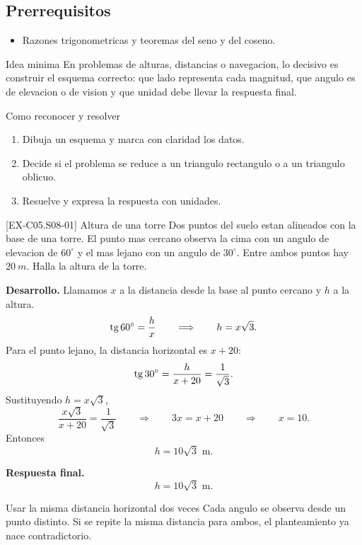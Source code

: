 \subsection*{Prerrequisitos}
\begin{itemize}
  \item Razones trigonometricas y teoremas del seno y del coseno.
\end{itemize}

\begin{theorybox}{Idea minima}
En problemas de alturas, distancias o navegacion, lo decisivo es construir el esquema correcto:
que lado representa cada magnitud, que angulo es de elevacion o de vision y que unidad debe
llevar la respuesta final.
\end{theorybox}

\begin{methodbox}{Como reconocer y resolver}
\begin{enumerate}
  \item Dibuja un esquema y marca con claridad los datos.
  \item Decide si el problema se reduce a un triangulo rectangulo o a un triangulo oblicuo.
  \item Resuelve y expresa la respuesta con unidades.
\end{enumerate}
\end{methodbox}

\begin{solvedexample}{[EX-C05.S08-01] Altura de una torre}
Dos puntos del suelo estan alineados con la base de una torre. El punto mas cercano observa la
cima con un angulo de elevacion de \(60^\circ\) y el mas lejano con un angulo de \(30^\circ\).
Entre ambos puntos hay \(\SI{20}{m}\). Halla la altura de la torre.

\textbf{Desarrollo.} Llamamos \(x\) a la distancia desde la base al punto cercano y \(h\) a la
altura.
\[
\operatorname{tg} 60^\circ=\frac{h}{x}
\qquad \Longrightarrow \qquad
h=x\sqrt{3}.
\]
Para el punto lejano, la distancia horizontal es \(x+20\):
\[
\operatorname{tg} 30^\circ=\frac{h}{x+20}=\frac{1}{\sqrt{3}}.
\]
Sustituyendo \(h=x\sqrt{3}\),
\[
\frac{x\sqrt{3}}{x+20}=\frac{1}{\sqrt{3}}
\qquad \Longrightarrow \qquad
3x=x+20
\qquad \Longrightarrow \qquad
x=10.
\]
Entonces
\[
h=10\sqrt{3}\text{ m}.
\]

\textbf{Respuesta final.}
\[
h=10\sqrt{3}\text{ m}.
\]
\end{solvedexample}

\begin{commonerror}{Usar la misma distancia horizontal dos veces}
Cada angulo se observa desde un punto distinto. Si se repite la misma distancia para ambos,
el planteamiento ya nace contradictorio.
\end{commonerror}

